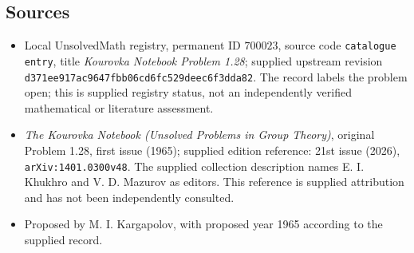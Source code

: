 \documentclass[11pt]{article}
\begin{document}
\subsection{Sources}
\begin{itemize}
\item Local UnsolvedMath registry, permanent ID \(700023\), source code \texttt{catalogue entry}, title \emph{Kourovka Notebook Problem 1.28}; supplied upstream revision \texttt{d371ee917ac9647fbb06cd6fc529deec6f3dda82}. The record labels the problem open; this is supplied registry status, not an independently verified mathematical or literature assessment.
\item \emph{The Kourovka Notebook (Unsolved Problems in Group Theory)}, original Problem 1.28, first issue (1965); supplied edition reference: 21st issue (2026), \texttt{arXiv:1401.0300v48}. The supplied collection description names E. I. Khukhro and V. D. Mazurov as editors. This reference is supplied attribution and has not been independently consulted.
\item Proposed by M. I. Kargapolov, with proposed year 1965 according to the supplied record.
\end{itemize}
\end{document}
